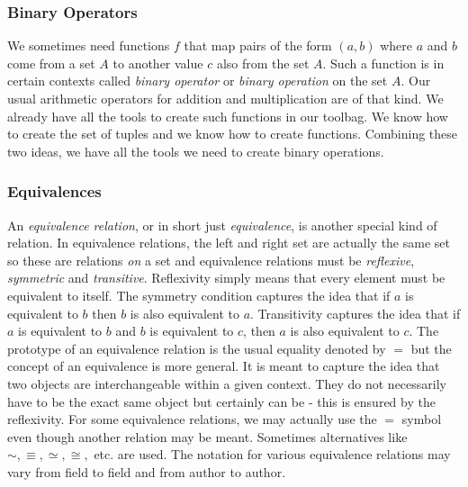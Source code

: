 \subsubsection{Binary Operators} We sometimes need functions $f$ that map pairs of the form $(a,b)$ where $a$ and $b$ come from a set $A$ to another value $c$ also from the set $A$. Such a function is in certain contexts called \emph{binary operator} or \emph{binary operation} on the set $A$. Our usual arithmetic operators for addition and multiplication are of that kind. We already have all the tools to create such functions in our toolbag. We know how to create the set of tuples and we know how to create functions. Combining these two ideas, we have all the tools we need to create binary operations.


\subsubsection{Equivalences} An \emph{equivalence relation}, or in short just \emph{equivalence}, is another special kind of relation. In equivalence relations, the left and right set are actually the same set so these are relations \emph{on} a set and equivalence relations must be \emph{reflexive}, \emph{symmetric} and \emph{transitive}. Reflexivity simply means that every element must be equivalent to itself. The symmetry condition captures the idea that if $a$ is equivalent to $b$ then $b$ is also equivalent to $a$. Transitivity captures the idea that if $a$ is equivalent to $b$ and $b$ is equivalent to $c$, then $a$ is also equivalent to $c$. The prototype of an equivalence relation is the usual equality denoted by $=$ but the concept of an equivalence is more general. It is meant to capture the idea that two objects are interchangeable within a given context. They do not necessarily have to be the exact same object but certainly can be - this is ensured by the reflexivity. For some equivalence relations, we may actually use the $=$ symbol even though another relation may be meant. Sometimes alternatives like $\sim, \equiv, \simeq, \cong,$ etc. are used. The notation for various equivalence relations may vary from field to field and from author to author. 


